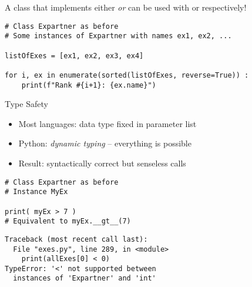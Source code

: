 
\begin{frame}[fragile]
%
\begin{hintbox}
A class that implements either  \emph{or}  can be used with  or  respectively!
\end{hintbox}
%
\begin{codebox}
\begin{verbatim}
# Class Expartner as before
# Some instances of Expartner with names ex1, ex2, ...

listOfExes = [ex1, ex2, ex3, ex4]

for i, ex in enumerate(sorted(listOfExes, reverse=True)) :
    print(f"Rank #{i+1}: {ex.name}")
\end{verbatim}
\end{codebox}
%
\end{frame}


\begin{frame}[fragile]{Type Safety}
%
\begin{itemize}
\item Most languages: data type fixed in parameter list
\item Python: \emph{dynamic typing} -- everything is possible
\item Result: syntactically correct but senseless calls
\end{itemize}

\vspace{6pt}
\begin{tcbraster}[raster columns=2,
                  raster equal height,
                  nobeforeafter,
                  raster column skip=0.5cm]
\begin{codebox}
\begin{verbatim}
# Class Expartner as before
# Instance MyEx

print( myEx > 7 )
# Equivalent to myEx.__gt__(7)
\end{verbatim}
\end{codebox}
%
\begin{cmdbox}
\begin{verbatim}
Traceback (most recent call last):
  File "exes.py", line 289, in <module>
    print(allExes[0] < 0)
TypeError: '<' not supported between
  instances of 'Expartner' and 'int'
\end{verbatim}
\end{cmdbox}
\end{tcbraster}
%
\end{frame}


